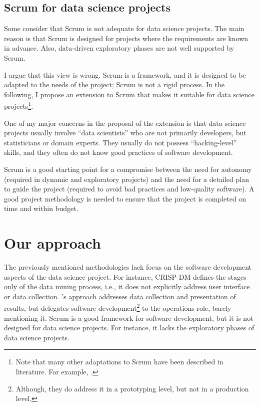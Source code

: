 \subsection{Scrum for data science projects}

Some consider that Scrum is not adequate for data science projects.  The main reason is
that Scrum is designed for projects where the requirements are known in advance.  Also,
data-driven exploratory phases are not well supported by Scrum.

I argue that this view is wrong.  Scrum is a framework, and it is designed to be adapted to
the needs of the project;  Scrum is not a rigid process.  In the following, I propose an
extension to Scrum that makes it suitable for data science projects\footnote{Note that
many other adaptations to Scrum have been described in literature.  For example,
.}.

One of my major concerns in the proposal of the extension is that data science projects
usually involve ``data scientists'' who are not primarily developers, but statisticians or
domain experts.  They usually do not possess ``hacking-level'' skills, and they often do not know
good practices of software development.

Scrum is a good starting point for a compromise between the need for autonomy (required in
dynamic and exploratory projects) and the need for a detailed plan to guide the project
(required to avoid bad practices and low-quality software). A good project methodology is
needed to ensure that the project is completed on time and within budget.

\section{Our approach}
\label{sec:our-approach}

The previously mentioned methodologies lack focus on the software development aspects of
the data science project.  For instance, CRISP-DM defines the stages only of the data
mining process, i.e., it does not explicitly address user interface or data collection.
\citeauthor{Zumel2019}'s approach addresses data collection and presentation of results, but
delegates software development\footnote{Although, they do address it in a prototyping level, but
not in a production level.} to the operations role, barely mentioning it.  Scrum is
a good framework for software development, but it is not designed for data science
projects.  For instance, it lacks the exploratory phases of data science projects.

